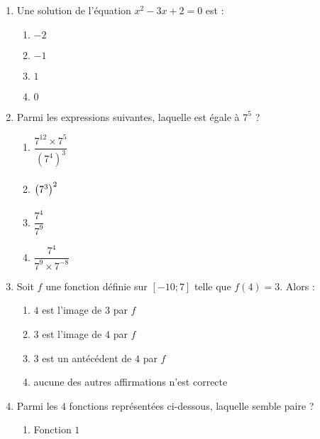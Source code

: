 \documentclass[a4paper,dvipsnames]{article}
\begin{document}
\begin{enumerate}
  \item Une solution de l'équation $x^2-3x+2=0$ est :
    \vspace{-3mm}
    \begin{multicols}{4}
      \begin{enumerate}
	\item $-2$
	\item $-1$
	\item $1$
	\item $0$
      \end{enumerate} 
    \end{multicols}
  \item Parmi les expressions suivantes, laquelle est égale à $7^5$ ?
    \vspace{-3mm}
    \begin{multicols}{4}
      \begin{enumerate}
	\item $\dfrac{7^{12}\times7^5}{\left(7^4\right)^3}$
	\item $\left(7^3\right)^2\vphantom{\dfrac{1^2}{2^2}}$
	\item $\dfrac{7^4}{7^9}$
	\item $\dfrac{7^4}{7^9\times7^{-8}}$
      \end{enumerate} 
    \end{multicols}
  \item Soit $f$ une fonction définie sur $[-10;7]$ telle que $f(4)=3$. Alors :
    \begin{multicols}{4}
      \begin{enumerate}
	\item $4$ est l'image de $3$ par $f$
	\item $3$ est l'image de $4$ par $f$
	\item $3$ est un antécédent de $4$ par $f$
	\item aucune des autres affirmations n'est correcte
      \end{enumerate}
    \end{multicols}
  \item Parmi les $4$ fonctions représentées ci-dessous, laquelle semble paire ?
    \vspace{-3mm}
    \begin{multicols}{2}
      \begin{enumerate}
	\item Fonction $1$
	  \begin{center}

\end{center}
\end{enumerate}
\end{multicols}
\end{enumerate}
\end{document}
